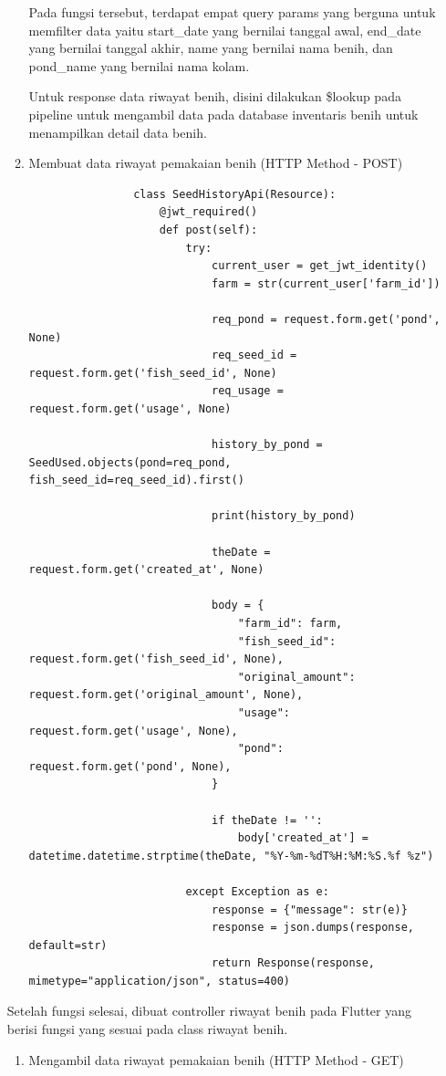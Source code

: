 \begin{spacing}{1.5}
\begin{enumerate}
\begin{enumerate}
			Pada fungsi tersebut, terdapat empat query params yang berguna untuk memfilter data yaitu start\_date yang bernilai tanggal awal, end\_date yang bernilai tanggal akhir, name yang bernilai nama benih, dan pond\_name yang bernilai nama kolam.

			Untuk response data riwayat benih, disini dilakukan \$lookup pada pipeline untuk mengambil data pada database inventaris benih untuk menampilkan detail data benih.

			\item Membuat data riwayat pemakaian benih (HTTP Method - POST)
			
			\begin{lstlisting}
				class SeedHistoryApi(Resource):
					@jwt_required()
					def post(self):
						try:
							current_user = get_jwt_identity()
							farm = str(current_user['farm_id'])
						
							req_pond = request.form.get('pond', None)
							req_seed_id = request.form.get('fish_seed_id', None)
							req_usage = request.form.get('usage', None) 
							
							history_by_pond =  SeedUsed.objects(pond=req_pond, fish_seed_id=req_seed_id).first()
				
							print(history_by_pond)
				
							theDate = request.form.get('created_at', None)
				
							body = {
								"farm_id": farm,
								"fish_seed_id": request.form.get('fish_seed_id', None),
								"original_amount": request.form.get('original_amount', None),
								"usage": request.form.get('usage', None),
								"pond": request.form.get('pond', None),
							}
				
							if theDate != '':
								body['created_at'] = datetime.datetime.strptime(theDate, "%Y-%m-%dT%H:%M:%S.%f %z") 
								
						except Exception as e:
							response = {"message": str(e)}
							response = json.dumps(response, default=str)
							return Response(response, mimetype="application/json", status=400)
			\end{lstlisting}
		\end{enumerate}

		Setelah fungsi selesai, dibuat controller riwayat benih pada Flutter yang berisi fungsi yang sesuai pada class riwayat benih.

		\begin{enumerate}
			\item Mengambil data riwayat pemakaian benih (HTTP Method - GET) 
			

\end{enumerate}
\end{enumerate}
\end{spacing}
